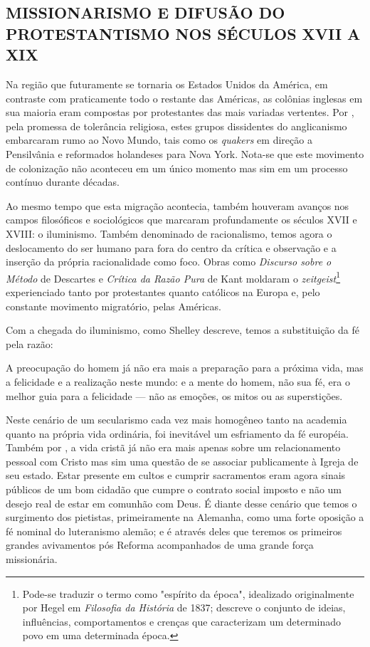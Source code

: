 \documentclass[
    article,            %
	12pt,				%
	oneside,			%
	a4paper,			%
	chapter=TITLE,		%
	section=TITLE,		%
	english,			%
	french,				%
	spanish,			%
	brazil				%
	]{abntex2}
\begin{document}
\subsection{MISSIONARISMO E DIFUSÃO DO PROTESTANTISMO NOS SÉCULOS XVII A XIX}
Na região que futuramente se tornaria os Estados Unidos da América, em contraste com praticamente todo o restante das Américas, as colônias inglesas em sua maioria eram compostas por protestantes das mais variadas vertentes. Por , pela promessa de tolerância religiosa, estes grupos dissidentes do anglicanismo embarcaram rumo ao Novo Mundo, tais como os \emph{quakers} em direção a Pensilvânia e reformados holandeses para Nova York. Nota-se que este movimento de colonização não aconteceu em um único momento mas sim em um processo contínuo durante décadas.

Ao mesmo tempo que esta migração acontecia, também houveram avanços nos campos filosóficos e sociológicos que marcaram profundamente os séculos XVII e XVIII: o iluminismo. Também denominado de racionalismo, temos agora o deslocamento do ser humano para fora do centro da crítica e observação e a inserção da própria racionalidade como foco. Obras como \emph{Discurso sobre o Método} de Descartes e \emph{Crítica da Razão Pura} de Kant moldaram o \emph{zeitgeist}\footnote{Pode-se traduzir o termo como "espírito da época", idealizado originalmente por Hegel em \emph{Filosofia da História} de 1837; descreve o conjunto de ideias, influências, comportamentos e crenças que caracterizam um determinado povo em uma determinada época.} experienciado tanto por protestantes quanto católicos na Europa e, pelo constante movimento migratório, pelas Américas.

Com a chegada do iluminismo, como Shelley descreve, temos a substituição da fé pela razão:
\begin{citacao}
A preocupação do homem já não era mais a preparação para a próxima vida, mas a felicidade e a realização neste mundo: e a mente do homem, não sua fé, era o melhor guia para a felicidade — não as emoções, os mitos ou as superstições. \cite[p.205]{SHELLEY}
\end{citacao}

Neste cenário de um secularismo cada vez mais homogêneo tanto na academia quanto na própria vida ordinária, foi inevitável um esfriamento da fé européia. Também por , a vida cristã já não era mais apenas sobre um relacionamento pessoal com Cristo mas sim uma questão de se associar publicamente à Igreja de seu estado. Estar presente em cultos e cumprir sacramentos eram agora sinais públicos de um bom cidadão que cumpre o contrato social imposto e não um desejo real de estar em comunhão com Deus. É diante desse cenário que temos o surgimento dos pietistas, primeiramente na Alemanha, como uma forte oposição a fé nominal do luteranismo alemão; e é através deles que teremos os primeiros grandes avivamentos pós Reforma acompanhados de uma grande força missionária.
\end{document}
